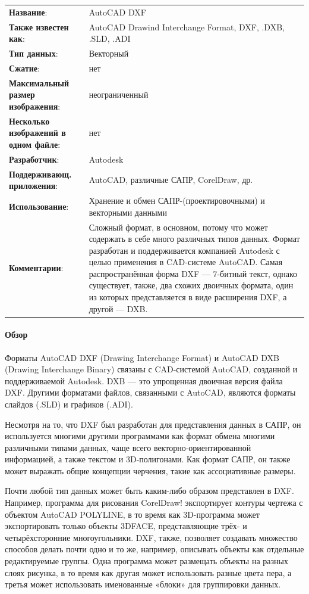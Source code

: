 \begin{longtable}{p{110pt} p{340pt}}
	\label{tab:dxf}
	\centering
	\textbf{Название}:&AutoCAD DXF\\
	\textbf{Также известен как}:&AutoCAD Drawind Interchange Format, DXF, .DXB, .SLD, .ADI\\
	\textbf{Тип данных}:&Векторный\\
	\textbf{Сжатие}:&нет\\
	\textbf{Максимальный размер изображения}:&неограниченный\\
	\textbf{Несколько изображений в одном файле}:&нет\\
	\textbf{Разработчик}:&Autodesk\\
	\textbf{Поддерживающ. приложения}:&AutoCAD, различные САПР, CorelDraw, др.\\
	\textbf{Использование}:&Хранение и обмен САПР-(проектировочными) и векторными данными\\
	\textbf{Комментарии}:&Сложный формат, в основном, потому что может содержать в себе много различных типов данных. Формат разработан и поддерживается компанией Autodesk с целью применения в CAD-системе AutoCAD. Самая распространённая форма DXF --- 7-битный текст, однако существует, также, два схожих двоичных формата, один из которых представляется в виде расширения DXF, а другой --- DXB.\\
\end{longtable}

\paragraph{Обзор}

Форматы AutoCAD DXF (Drawing Interchange Format) и AutoCAD DXB (Drawing Interchange Binary) связаны с CAD-системой AutoCAD, созданной и поддерживаемой Autodesk. DXB — это упрощенная двоичная версия файла DXF. Другими форматами файлов, связанными с AutoCAD, являются форматы слайдов (.SLD) и графиков (.ADI).

Несмотря на то, что DXF был разработан для представления данных в САПР, он используется многими другими программами как формат обмена многими различными типами данных, чаще всего векторно-ориентированной информацией, а также текстом и 3D-полигонами. Как формат САПР, он также может выражать общие концепции черчения, такие как ассоциативные размеры.

Почти любой тип данных может быть каким-либо образом представлен в DXF. Например, программа для рисования CorelDraw! экспортирует контуры чертежа с объектом AutoCAD POLYLINE, в то время как 3D-программа может экспортировать только объекты 3DFACE, представляющие трёх- и четырёхсторонние многоугольники. DXF, также, позволяет создавать множество способов делать почти одно и то же, например, описывать объекты как отдельные редактируемые группы. Одна программа может размещать объекты на разных слоях рисунка, в то время как другая может использовать разные цвета пера, а третья может использовать именованные «блоки» для группировки данных.


